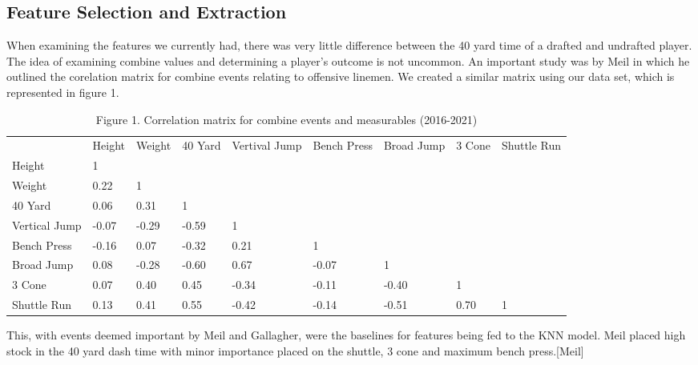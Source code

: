 \documentclass[confrence]{IEEEtran}
\begin{document}
\subsection*{Feature Selection and Extraction}
When examining the features we currently had, there was very little difference between the 40 yard time of a drafted and undrafted player.
The idea of examining combine values and determining a player's outcome is not uncommon.
An important study was by Meil in which he outlined the corelation matrix for combine events relating to offensive linemen.
We created a similar matrix using our data set, which is represented in figure 1.
\begin{table*}[htbp]
    \begin{tabular}{lllllllll}
                      & Height & Weight & 40 Yard & Vertival Jump & Bench Press & Broad Jump & 3 Cone & Shuttle Run \\
        Height        & 1      &        &         &               &             &            &        &             \\
        Weight        & 0.22   & 1      &         &               &             &            &        &             \\
        40 Yard       & 0.06   & 0.31   & 1       &               &             &            &        &             \\
        Vertical Jump & -0.07  & -0.29  & -0.59   & 1             &             &            &        &             \\
        Bench Press   & -0.16  & 0.07   & -0.32   & 0.21          & 1           &            &        &             \\
        Broad Jump    & 0.08   & -0.28  & -0.60   & 0.67          & -0.07       & 1          &        &             \\
        3 Cone        & 0.07   & 0.40   & 0.45    & -0.34         & -0.11       & -0.40      & 1      &             \\
        Shuttle Run   & 0.13   & 0.41   & 0.55    & -0.42         & -0.14       & -0.51      & 0.70   & 1
    \end{tabular}
    \caption*{Figure 1. Correlation matrix for combine events and measurables (2016-2021)}
\end{table*}
This, with events deemed important by Meil and Gallagher, were the baselines for features being fed to the KNN model.
Meil placed high stock in the 40 yard dash time with minor importance placed on the shuttle, 3 cone and maximum bench press.[Meil]
\end{document}
